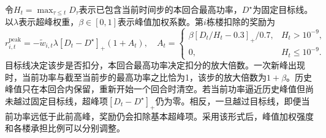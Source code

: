 令$H_t=\max_{\tau\leq t}D_\tau$表示已包含当前时间步的本回合最高功率，$D^\star$为固定目标线。以$\lambda$表示超峰权重，$\beta\in[0,1]$表示峰值加权系数。第$i$栋楼扣除的奖励为
\begin{equation}
    \label{eq:district-peak-reward}
    r^{\mathrm{peak}}_{i,t}=-\widetilde w_{i,t}\lambda[D_t-D^\star]_+(1+A_t),\quad
    A_t=\begin{cases}
        \beta[D_t/H_t-0.3]_+/0.7, & H_t>10^{-9},    \\
        0,                        & H_t\leq10^{-9}.
    \end{cases}
\end{equation}
目标线决定该步是否扣分，本回合最高功率决定扣分的放大倍数。一次新峰出现时，当前功率与截至当前步的最高功率之比恰为1，该步的放大倍数为$1+\beta$。历史峰值只在本回合内保留，重新开始一个回合时清空。若当前功率逼近历史峰值但尚未越过固定目标线，超峰项$[D_t-D^\star]_+$仍为零。相反，一旦越过目标线，即便当前功率远低于此前高峰，奖励仍会扣除基本超峰项。采用该形式后，峰值加权强度和各楼承担比例可以分别调整。

